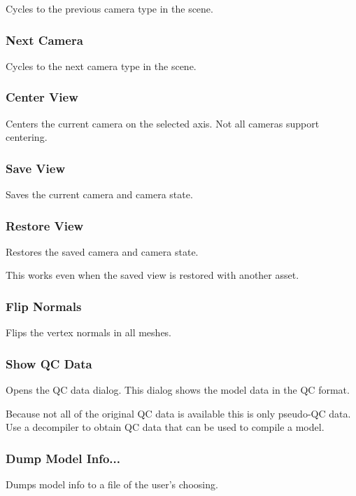 \documentclass[10pt, a4paper, titlepage, oneside]{article}
\begin{document}
Cycles to the previous camera type in the scene.

\subsubsection{Next Camera}

Cycles to the next camera type in the scene.

\subsubsection{Center View}

Centers the current camera on the selected axis. Not all cameras support centering.

\subsubsection{Save View}

Saves the current camera and camera state.

\subsubsection{Restore View}

Restores the saved camera and camera state.

This works even when the saved view is restored with another asset.

\subsubsection{Flip Normals}

Flips the vertex normals in all meshes.

\subsubsection{Show QC Data}

Opens the QC data dialog. This dialog shows the model data in the QC format.

Because not all of the original QC data is available this is only pseudo-QC data. Use a decompiler to obtain QC data that can be used to compile a model.

\subsubsection{Dump Model Info...}

Dumps model info to a file of the user's choosing.
\end{document}
